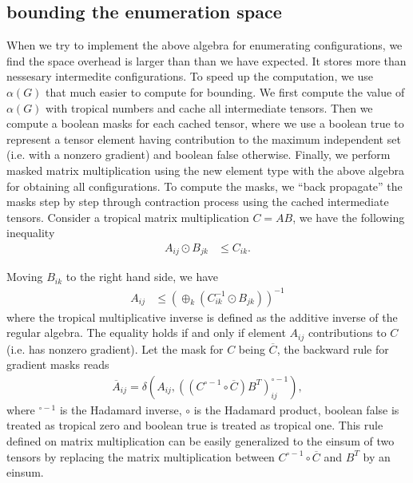 \documentclass{article}
\newcommand{\<}{\langle}
\renewcommand{\>}{\rangle}
\theoremstyle{definition}\newtheorem{definition}{\textit{Definition}}
\begin{document}
\subsection{bounding the enumeration space}
When we try to implement the above algebra for enumerating configurations, we find the space overhead is larger than than we have expected.
It stores more than nessesary intermedite configurations. To speed up the computation, we use $\alpha(G)$ that much easier to compute for bounding.
We first compute the value of $\alpha(G)$ with tropical numbers and cache all intermediate tensors.
Then we compute a boolean masks for each cached tensor, where we use a boolean true to represent a tensor element having contribution to the maximum independent set (i.e. with a nonzero gradient) and boolean false otherwise.
Finally, we perform masked matrix multiplication using the new element type with the above algebra for obtaining all configurations.
To compute the masks, we ``back propagate'' the masks step by step through contraction process using the cached intermediate tensors.
Consider a tropical matrix multiplication $C = A B$, we have the following inequality
\begin{align}
    A_{ij} \odot B_{jk} &\leq C_{ik}.
\end{align}

Moving $B_{ik}$ to the right hand side, we have
\begin{align}
    A_{ij} &\leq (\oplus_{k} (C_{ik}^{-1} \odot B_{jk}))^{-1}
\end{align}
where the tropical multiplicative inverse is defined as the additive inverse of the regular algebra. The equality holds if and only if element $A_{ij}$ contributions to $C$ (i.e. has nonzero gradient).
Let the mask for $C$ being $\overline C$, the backward rule for gradient masks reads
\begin{align}
\overline{A}_{ij} = \delta(A_{ij}, ((C^{\circ-1} \circ \overline C )B^T)_{ij}^{\circ -1}),
\end{align}
where ${}^{\circ -1}$ is the Hadamard inverse, $\circ$ is the Hadamard product, boolean false is treated as tropical zero and boolean true is treated as tropical one.
This rule defined on matrix multiplication can be easily generalized to the einsum of two tensors by replacing the matrix multiplication between $C^{\circ-1} \circ \overline C$ and $B^T$ by an einsum.
\end{document}
